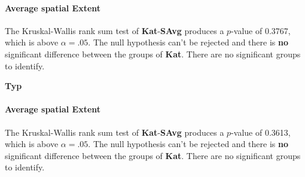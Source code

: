 \paragraph{Average spatial Extent}
The Kruskal-Wallis rank sum test of \textbf{Kat}-\textbf{SAvg} produces a $p$-value of 0.3767, which is above $\alpha=.05$. The null hypothesis can't be rejected and there is \textbf{no} significant difference between the groups of \textbf{Kat}. There are no significant groups to identify.

\Large
\centerline{\textbf{Typ}}
\normalsize

\paragraph{Average spatial Extent}
The Kruskal-Wallis rank sum test of \textbf{Kat}-\textbf{SAvg} produces a $p$-value of 0.3613, which is above $\alpha=.05$. The null hypothesis can't be rejected and there is \textbf{no} significant difference between the groups of \textbf{Kat}. There are no significant groups to identify.

